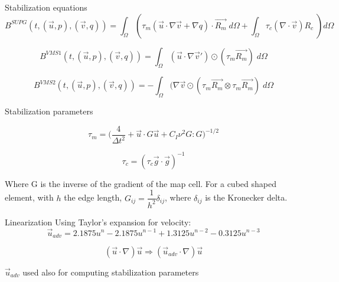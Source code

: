 \begin{frame}{Stabilization equations}
\begin{equation}
B^{SUPG}(t, (\Vec{u},p), (\Vec{v},q))  =     \int_\Omega(\tau_m(\Vec{u}\cdot\nabla \Vec{v} +\nabla q)\cdot\Vec{R_m} \;d\Omega+ \int_\Omega \tau_c (\nabla \cdot \Vec{v})R_c \;)d\Omega
\label{equ:bsupg}
\end{equation}

\begin{equation}
B^{VMS1}(t, (\Vec{u},p), (\Vec{v},q))  = \int_\Omega (\Vec{u}\cdot\nabla \Vec{v}')\odot(\tau_m \Vec{R_m}) \;d\Omega
\label{equ:bvms1}
\end{equation}


\begin{equation}
B^{VMS2}(t, (\Vec{u},p), (\Vec{v},q))  = -\int_\Omega (\nabla\Vec{v}\odot(\tau_m \Vec{R_m} \otimes \tau_m \Vec{R_m}) \;d\Omega
\label{equ:bvms2}
\end{equation}

\end{frame}


\begin{frame}{Stabilization parameters}

\begin{equation}
\tau_m =\bigg( \dfrac{4}{\Delta t^2} + \Vec{u}\cdot{G}\Vec{u} + C_I \nu^2 {G}:{G} \bigg)^{-1/2}
\label{equ:taum}
\end{equation}

\begin{equation}
\tau_c = (\tau_c\Vec{g}\cdot\Vec{g})^{-1}
\label{equ:tauc}
\end{equation}

Where G is the inverse of the gradient of the map cell.
For a cubed shaped element, with $h$ the edge length, $G_{ij} =\dfrac{1}{h^2}\delta_{ij}$, where $\delta_{ij}$ is the Kronecker delta.

\end{frame}


\begin{frame}{Linearization}
Using Taylor's expansion for velocity:
\begin{equation}
    \Vec{u}_{adv} = 2.1875 u^{n} - 2.1875 u^{n-1} + 1.3125 u^{n-2} - 0.3125 u^{n-3} 
    \label{equlin:taylor_exp}
\end{equation}

\begin{equation}
 (\Vec{u}\cdot\nabla)\Vec{u} \Rightarrow  (\Vec{u}_{adv}\cdot\nabla)\Vec{u} 
\end{equation}

$\Vec{u}_{adv}$ used also for computing stabilization parameters


\end{frame}

